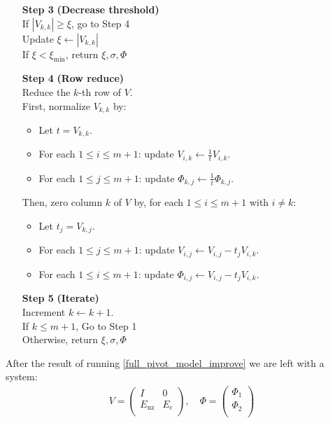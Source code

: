 \documentclass{article}
\theoremstyle{case}
\newcommand{\ximin}{{\xi_{\textrm{min}}}}
\newcommand{\lunonzero}{{E_{\textrm{nz}}}}
\newcommand{\lusmall}{{E_{\epsilon}}}
\begin{document}
\begin{algorithm}[H]
\begin{itemize}
        
        \item[\textbf{Step 3}] \textbf{(Decrease threshold)} \\
        	If $|V_{k,k}| \ge \xi$, go to Step 4 \\
        	Update $\xi \gets |V_{k, k}|$ \\
        	If $\xi < \ximin$, return $\xi, \sigma, \Phi$ \\
        \item[\textbf{Step 4}] \textbf{(Row reduce)} \\
        	Reduce the $k$-th row of $V$.\\
        	First, normalize $V_{k, k}$ by:
        	\begin{itemize}
        		\item Let $t = V_{k, k}$.
        		\item For each $1 \le i \le m+1$: update $V_{i, k} \gets \frac 1 t V_{i, k}$.
        		\item For each $1 \le j \le m+1$: update $\Phi_{k, j} \gets \frac 1 t \Phi_{k, j}$.
        	\end{itemize}
        	Then, zero column $k$ of $V$ by, for each $1 \le i \le m+1$ with $i \ne k$:
        	\begin{itemize}
        		\item Let $t_j = V_{k, j}$.
        		\item For each $1\le j \le m+1$: update $V_{i, j} \gets V_{i, j} - t_j V_{i, k}$.
        		\item For each $1\le i \le m+1$: update $\Phi_{i, j} \gets V_{i, j} - t_j V_{i, k}$.
        	\end{itemize}
        	
        	
        \item[\textbf{Step 5}] \textbf{(Iterate)} \\
        	Increment $k \gets k + 1$. \\
        	If $k \le m+1$, Go to Step 1 \\
        	Otherwise, return $\xi, \sigma, \Phi$
    \end{itemize}
\end{algorithm}


After the result of running \cref{full_pivot_model_improve} we are left with a system:
\begin{align*}
V = \begin{pmatrix}
I & 0 \\
\lunonzero  & \lusmall \\
\end{pmatrix}, \quad \Phi = \begin{pmatrix}
\Phi_1 \\
\Phi_2 \\
\end{pmatrix}
\end{align*}
\end{document}
